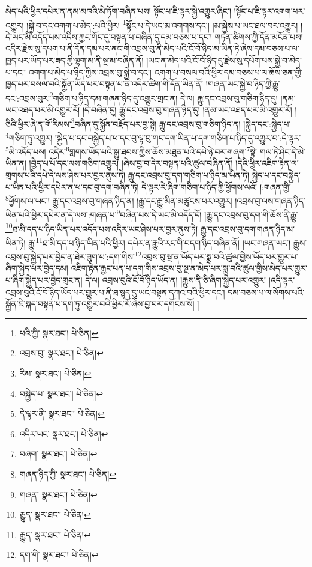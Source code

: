 མེད་པའི་ཕྱིར་དཔེར་ན་ནམ་མཁའི་མེ་ཏོག་བཞིན་པས། སྟོང་པ་ཇི་ལྟར་སྐྱེ་འགྱུར་ཞིང་། །སྟོང་པ་ཇི་ལྟར་འགག་པར་འགྱུར། །སྐྱེ་བ་དང་འགག་པ་མེད་:པའི་ཕྱིར། \footnote{པའི་ཀྱི་  སྣར་ཐང་།  པེ་ཅིན། }སྟོང་པ་དེ་ཡང་མ་འགགས་དང་། །མ་སྐྱེས་པ་ཡང་ཐལ་བར་འགྱུར། །དེ་ཡང་མི་འདོད་པས་འདིས་ཀྱང་གོང་དུ་བསྟན་པ་བཞིན་དུ་དམ་བཅས་པ་དང་། གཏན་ཚིགས་ཀྱི་དོན་མངོན་པས། འདིར་རྗེས་སུ་དཔག་པ་ནི་དོན་དམ་པར་ནང་གི་འབྲས་བུ་ནི་མེད་པའི་ངོ་བོ་ཉིད་མ་ཡིན་ཏེ་ཞེས་དམ་བཅས་པ་ལ་ཁྱད་པར་ཡོད་པར་ཟད་ཀྱི་ལྷག་མ་ནི་སྔ་མ་བཞིན་ནོ། །ཡང་ན་མེད་པའི་ངོ་བོ་ཉིད་དུ་རྗེས་སུ་དཔོག་པས་སྐྱེ་བ་མེད་པ་དང་། འགག་པ་མེད་པ་ཉིད་ཀྱིས་འབྲས་བུ་སྐྱེ་བ་དང་། འགག་པ་བསལ་བའི་ཕྱིར་དམ་བཅས་པ་ལ་ཆོས་ཅན་གྱི་ཁྱད་པར་བསལ་བའི་སྐྱོན་ཡོད་པར་བསྟན་པ་ནི་འདིར་ཚིག་གི་དོན་ཡིན་ནོ། །གཞན་ཡང་སྐྱེ་བ་ཉིད་ཀྱི་རྒྱུ་དང་:འབྲས་བུར་\footnote{འབྲས་བུ་  སྣར་ཐང་།  པེ་ཅིན། }གཅིག་པ་ཉིད་དམ་གཞན་ཉིད་དུ་འགྱུར་གྲང་ན། དེ་ལ། རྒྱུ་དང་འབྲས་བུ་གཅིག་ཉིད་དུ། །ནམ་ཡང་འཐད་པར་མི་འགྱུར་རོ། །དེ་བཞིན་དུ། རྒྱུ་དང་འབྲས་བུ་གཞན་ཉིད་དུ། །ནམ་ཡང་འཐད་པར་མི་འགྱུར་རོ། །ཅིའི་ཕྱིར་ཞེ་ན་གོ་རིམས་\footnote{རིམ་  སྣར་ཐང་།  པེ་ཅིན། }བཞིན་དུ་སྐྱོན་བརྗོད་པར་བྱ་སྟེ། རྒྱུ་དང་འབྲས་བུ་གཅིག་ཉིད་ན། །སྐྱེད་དང་:སྐྱེད་པ་\footnote{བསྐྱེད་པ་  སྣར་ཐང་།  པེ་ཅིན། }གཅིག་ཏུ་འགྱུར། །སྐྱེད་པ་དང་བསྐྱེད་པ་ཕ་དང་བུ་ལྟ་བུ་གང་དག་ཡིན་པ་དག་གཅིག་པ་ཉིད་དུ་འགྱུར་བ་:དེ་ལྟར་\footnote{དེ་ལྟར་ནི་  སྣར་ཐང་།  པེ་ཅིན། }མི་འདོད་པས། འདིར་\footnote{འདིར་ཡང་  སྣར་ཐང་།  པེ་ཅིན། }གླགས་ཡོད་པའི་སྒྱུ་ཐབས་ཀྱིས་ཆོས་མཐུན་པའི་དཔེ་ཉེ་བར་གཞག་\footnote{བཞག་  སྣར་ཐང་།  པེ་ཅིན། }སྟེ། གལ་ཏེ་ཤིང་དེ་མེ་ཡིན་ན། །བྱེད་པ་པོ་དང་ལས་གཅིག་འགྱུར། །ཞེས་བྱ་བ་དེར་བསྟན་པའི་ཚུལ་བཞིན་ནོ། །དེའི་ཕྱིར་འཇིག་རྟེན་ལ་གྲགས་པའི་དཔེ་དེ་ལས་ཤེས་པར་བྱར་ནུས་ཏེ། རྒྱུ་དང་འབྲས་བུ་དག་གཅིག་པ་ཉིད་མ་ཡིན་ཏེ། སྐྱེད་པ་དང་བསྐྱེད་པ་ཡིན་པའི་ཕྱིར་དཔེར་ན་ཕ་དང་བུ་དག་བཞིན་ཏེ། དེ་ལྟར་རེ་ཞིག་གཅིག་པ་ཉིད་ཀྱི་ཕྱོགས་ལའོ། །:གཞན་གྱི་\footnote{གཞན་ཉིད་ཀྱི་  སྣར་ཐང་།  པེ་ཅིན། }ཕྱོགས་ལ་ཡང་། རྒྱུ་དང་འབྲས་བུ་གཞན་ཉིད་ན། །རྒྱུ་དང་རྒྱུ་མིན་མཚུངས་པར་འགྱུར། །འབྲས་བུ་ལས་གཞན་ཉིད་ཡིན་པའི་ཕྱིར་དཔེར་ན་དེ་ལས་:གཞན་པ་\footnote{གཞན་  སྣར་ཐང་།  པེ་ཅིན། }བཞིན་པས་དེ་ཡང་མི་འདོད་དོ། །རྒྱུ་དང་འབྲས་བུ་དག་གི་ཆོས་ནི་རྒྱུ་\footnote{རྒྱུད་  སྣར་ཐང་།  པེ་ཅིན། }ཐ་མི་དད་པ་ཉིད་ཡིན་པར་འདོད་པས་འདིར་ཡང་ཤེས་པར་བྱར་ནུས་ཏེ། རྒྱུ་དང་འབྲས་བུ་དག་གཞན་ཉིད་མ་ཡིན་ཏེ། རྒྱུ་\footnote{རྒྱུད་  སྣར་ཐང་།  པེ་ཅིན། }ཐ་མི་དད་པ་ཉིད་ཡིན་པའི་ཕྱིར། དཔེར་ན་རྒྱུའི་རང་གི་བདག་ཉིད་བཞིན་ནོ། །ཡང་གཞན་ཡང་། རྒྱུས་འབྲས་བུ་སྐྱེད་པར་བྱེད་ན་ཐེར་ཟུག་པ་:དག་གིས་\footnote{དག་གི་  སྣར་ཐང་།  པེ་ཅིན། }འབྲས་བུ་སྔ་ན་ཡོད་པར་སྨྲ་བའི་ཚུལ་གྱིས་ཡོད་པར་གྱུར་པ་ཞིག་སྐྱེད་པར་བྱེད་དམ། འཇིག་རྟེན་རྒྱང་པན་པ་དག་གིས་འབྲས་བུ་སྔ་ན་མེད་པར་སྨྲ་བའི་ཚུལ་གྱིས་མེད་པར་གྱུར་པ་ཞིག་སྐྱེད་པར་བྱེད་གྲང་ན། དེ་ལ། འབྲས་བུའི་ངོ་བོ་ཉིད་ཡོད་ན། །རྒྱུས་ནི་ཅི་ཞིག་སྐྱེད་པར་འགྱུར། །འདི་ལྟར་འབྲས་བུའི་ངོ་བོ་ཉིད་ཡོད་པར་གྱུར་པ་ནི་ཐ་སྙད་དུ་ཡང་བསྟན་དཀའ་བའི་ཕྱིར་དང་། དམ་བཅས་པ་ལ་སོགས་པའི་སྐྱོན་ཇི་སྐད་བསྟན་པ་དག་ཏུ་འགྱུར་བའི་ཕྱིར་རོ་ཞེས་བྱ་བར་དགོངས་སོ། །
